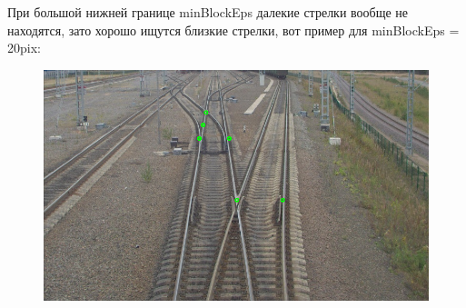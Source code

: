 При большой нижней границе minBlockEps далекие стрелки вообще не находятся, зато хорошо ищутся близкие стрелки, вот пример для minBlockEps = 20pix:
\begin{figure}[!h]
	\centering
	\includegraphics[width=0.7\linewidth]{pictures/45_20.png}
	\caption[Y - обратное]{}
	\label{fig:45_20}
\end{figure}


